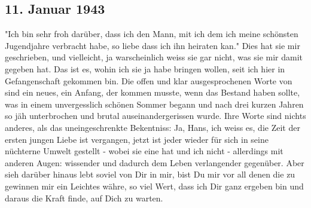 \subsection{11. Januar 1943}

"Ich bin sehr froh dar\"{u}ber, dass ich den Mann, mit ich dem ich meine sch\"{o}nsten Jugendjahre verbracht habe, so liebe dass ich ihn heiraten kan."
Dies hat sie mir geschrieben, und vielleicht, ja warscheinlich weiss sie gar nicht, was sie mir damit gegeben hat.
Das ist es, wohin ich sie ja habe bringen wollen, seit ich hier in Gefangenschaft gekommen bin.
Die offen und klar ausgesprochenen Worte von sind ein neues, ein Anfang, der kommen musste, wenn das Bestand haben sollte, was in einem unvergesslich sch\"{o}nen Sommer begann und nach drei kurzen Jahren so j\"{a}h unterbrochen und brutal auseinandergerissen wurde.
Ihre Worte sind nichts anderes, als das uneingeschrenkte Bekentniss: Ja, Hans, ich weiss es, die Zeit der ersten jungen Liebe ist vergangen, jetzt ist jeder wieder f\"{u}r sich in seine n\"{u}chterne Umwelt gestellt - wobei sie eine hat und ich nicht - allerdings mit anderen Augen: wissender und dadurch dem Leben verlangender gegen\"{u}ber.
Aber sieh dar\"{u}ber hinaus lebt soviel von Dir in mir, bist Du mir vor all denen die zu gewinnen mir ein Leichtes w\"{a}hre, so viel Wert, dass ich Dir ganz ergeben bin und daraus die Kraft finde, auf Dich zu warten.

\clearpage

